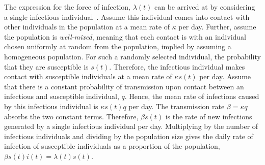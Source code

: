 \documentclass[thesis.tex]{subfiles}
\begin{document}
The expression for the force of infection, $\lambda(t)$ can be arrived at by considering a single infectious individual~\autocite[214]{kretzschmarMathematical}.
Assume this individual comes into contact with other individuals in the population at a mean rate of $\kappa$ per day.
Further, assume the population is \emph{well-mixed}, meaning that each contact is with an individual chosen uniformly at random from the population, implied by assuming a homogeneous population.
For such a randomly selected individual, the probability that they are susceptible is $s(t)$.
Therefore, the infectious individual makes contact with susceptible individuals at a mean rate of $\kappa s(t)$ per day.
Assume that there is a constant probability of transmission upon contact between an infectious and susceptible individual, $q$.
Hence, the mean rate of infections caused by this infectious individual is $\kappa s(t) q$ per day.
The transmission rate $\beta = \kappa q$ absorbs the two constant terms.
Therefore, $\beta s(t)$ is the rate of new infections generated by a single infectious individual per day.
Multiplying by the number of infectious individuals and dividing by the population size gives the daily rate of infection of susceptible individuals as a proportion of the population, $\beta s(t) i(t) = \lambda(t) s(t)$.

\end{document}
